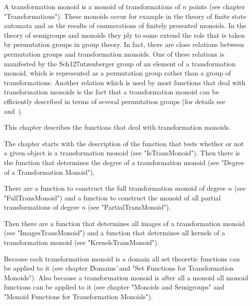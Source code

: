 
A transformation monoid is a monoid of transformations of $n$ points (see
chapter "Transformations").   These  monoids occur   for example in   the
theory of finite state  automata and  as  the results of enumerations  of
finitely presented monoids.  In the theory of semigroups and monoids they
ply to some extend the role that is taken  by permutation groups in group
theory.  In fact, there are  close  relations between permutation  groups
and transformation monoids.  One of these relations  is manifested by the
Sch\accent127utzenberger group of an element  of a transformation monoid,
which  is represented  as  a permutation  group rather   than a group  of
transformations.   Another relation which  is used by most functions that
deal with transformation monoids is the fact that a transformation monoid
can be efficiently described in terms  of several permutation groups (for
details see~\cite{LPRR1} and~\cite{LPRR2}).

This   chapter describes the    functions  that deal with  transformation
monoids.

The chapter  starts with  the  description of   the function  that  tests
whether  or   not  a  given   object  is a   transformation  monoid  (see
"IsTransMonoid").  Then there is  the function that determines the degree
of a transformation monoid (see "Degree of a Transformation Monoid").

There are  a function to   construct  the full transformation  monoid  of
degree $n$ (see "FullTransMonoid") and a function to construct the monoid
of all partial transformations of degree $n$ (see "PartialTransMonoid").

Then there are a function that determines all  images of a transformation
monoid (see  "ImagesTransMonoid") and   a function that    determines all
kernels of a transformation monoid (see "KernelsTransMonoid").

Because  each transformation monoid   is   a domain  all  set   theoretic
functions can  be   applied to it  (see   chapter  \"Domains\"\ and  "Set
Functions  for  Transformation Monoids").  Also because  a transformation
monoid is after  all a monoid all  monoid functions can  be applied to it
(see chapter   "Monoids and Semigroups"      and "Monoid Functions    for
Transformation Monoids").

